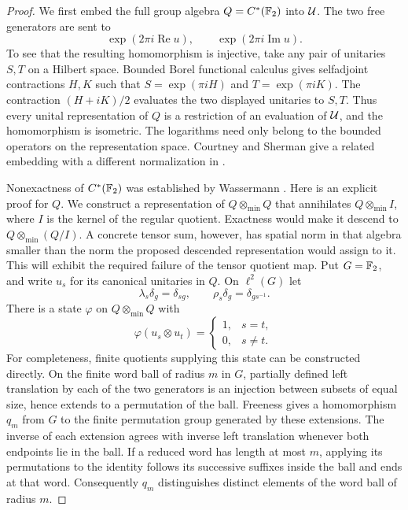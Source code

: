 \begin{proof}
We first embed the full group algebra $Q=C^*(\mathbb F_2)$ into $\mathcal U$.
The two free generators are sent to
\[
 \exp(2\pi i\operatorname{Re}u),
 \qquad \exp(2\pi i\operatorname{Im}u).
\]
To see that the resulting homomorphism is injective, take any pair of
unitaries $S,T$ on a Hilbert space.  Bounded Borel functional calculus
gives selfadjoint contractions $H,K$ such that
$S=\exp(\pi iH)$ and $T=\exp(\pi iK)$.  The contraction
$(H+iK)/2$ evaluates the two displayed unitaries to $S,T$.
Thus every unital representation of $Q$ is a restriction of an evaluation of
$\mathcal U$, and the homomorphism is isometric.  The logarithms need only
belong to the bounded operators on the representation space.
Courtney and Sherman give a related embedding with a different
normalization in \cite[Theorem~6.10]{CS}.

Nonexactness of $C^*(\mathbb F_2)$ was established by
Wassermann \cite{Wassermann1976}.  Here is an explicit proof for $Q$.
We construct a representation of $Q\otimes_{\min}Q$ that annihilates
$Q\otimes_{\min}I$, where $I$ is the kernel of the regular quotient.
Exactness would make it descend to $Q\otimes_{\min}(Q/I)$.  A concrete
tensor sum, however, has spatial norm in that algebra smaller than the
norm the proposed descended representation would assign to it.
This will exhibit the required failure of the tensor quotient map.
Put $G=\mathbb F_2$, and
write $u_s$ for its canonical unitaries in $Q$.  On $\ell^2(G)$ let
\[
 \lambda_s\delta_g=\delta_{sg},
 \qquad \rho_s\delta_g=\delta_{gs^{-1}}.
\]
There is a state $\varphi$ on $Q\otimes_{\min}Q$ with
\begin{equation}\label{eq:diagonal-state}
 \varphi(u_s\otimes u_t)=
 \begin{cases}1,&s=t,\\0,&s\ne t.\end{cases}
\end{equation}
For completeness, finite quotients supplying this state can be
constructed directly.  On the finite word ball of radius $m$ in $G$,
partially defined left translation by each of the two generators is
an injection between subsets of equal size, hence extends to a
permutation of the ball.  Freeness gives a homomorphism $q_m$ from
$G$ to the finite permutation group generated by these extensions.
The inverse of each extension agrees with inverse left translation
whenever both endpoints lie in the ball.
If a reduced word has length at most $m$, applying its permutations
to the identity follows its successive suffixes inside the ball and
ends at that word.  Consequently $q_m$ distinguishes distinct elements
of the word ball of radius $m$.


\end{proof}
